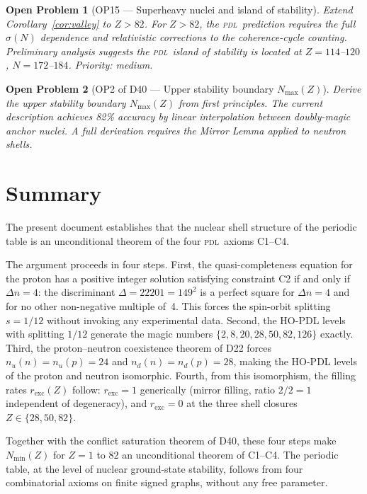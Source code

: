 \documentclass[12pt,a4paper]{article}
\newcommand{\Nmax}{N_\mathrm{max}}
\newtheorem{openproblem}{Open Problem}
\newcommand{\PDL}{\textsc{pdl}}
\newcommand{\nuu}{n_u}
\newcommand{\ndd}{n_d}
\newcommand{\Dn}{\Delta n}
\newcommand{\Nmin}{N_{\min}}
\newcommand{\rexc}{r_{\mathrm{exc}}}
\begin{document}
\begin{openproblem}[OP15 --- Superheavy nuclei and island of stability]
\label{op:superheavy}
Extend Corollary~\ref{cor:valley} to $Z > 82$. For $Z > 82$, the \PDL\ prediction requires the full $\sigma(N)$ dependence and relativistic corrections to the coherence-cycle counting. Preliminary analysis suggests the \PDL\ island of stability is located at $Z = 114$--$120$, $N = 172$--$184$. Priority: medium.
\end{openproblem}

\begin{openproblem}[OP2 of D40 --- Upper stability boundary $\Nmax(Z)$]
\label{op:Nmax}
Derive the upper stability boundary $\Nmax(Z)$ from first principles. The current description achieves 82\% accuracy by linear interpolation between doubly-magic anchor nuclei. A full derivation requires the Mirror Lemma applied to neutron shells.
\end{openproblem}

\section{Summary}
\label{sec:summary}

The present document establishes that the nuclear shell structure of the periodic table is an unconditional theorem of the four \PDL\ axioms C1--C4.

The argument proceeds in four steps. First, the quasi-completeness equation for the proton has a positive integer solution satisfying constraint C2 if and only if $\Dn = 4$: the discriminant $\Delta = 22201 = 149^2$ is a perfect square for $\Dn = 4$ and for no other non-negative multiple of~4. This forces the spin-orbit splitting $s = 1/12$ without invoking any experimental data. Second, the HO-PDL levels with splitting $1/12$ generate the magic numbers $\{2,8,20,28,50,82,126\}$ exactly. Third, the proton--neutron coexistence theorem of D22 forces $\nuu(n) = \nuu(p) = 24$ and $\ndd(n) = \ndd(p) = 28$, making the HO-PDL levels of the proton and neutron isomorphic. Fourth, from this isomorphism, the filling rates $\rexc(Z)$ follow: $\rexc = 1$ generically (mirror filling, ratio $2/2 = 1$ independent of degeneracy), and $\rexc = 0$ at the three shell closures $Z \in \{28,50,82\}$.

Together with the conflict saturation theorem of D40, these four steps make $\Nmin(Z)$ for $Z = 1$ to $82$ an unconditional theorem of C1--C4. The periodic table, at the level of nuclear ground-state stability, follows from four combinatorial axioms on finite signed graphs, without any free parameter.

\clearpage



\end{document}
